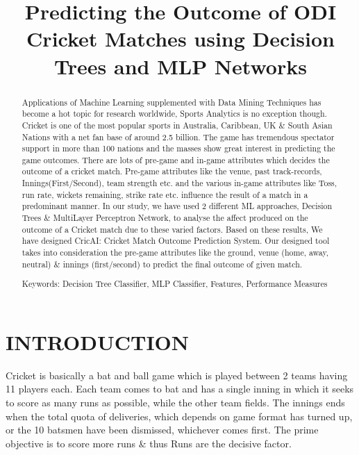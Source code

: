 \documentclass[a4paper, 10pt, conference]{IEEEtran}
\title{Predicting the Outcome of ODI Cricket Matches using Decision Trees and MLP Networks}
\author{
\IEEEauthorblockN{Rajeev Kumar\IEEEauthorrefmark{1},Jalaz Kumar\IEEEauthorrefmark{2}}
\IEEEauthorblockA{
\IEEEauthorrefmark{1}Assistant Professor,\IEEEauthorrefmark{2}Student\\
Department of Computer Science and Engineering\\
National Institute of Technology Hamirpur, India\\
Email: \IEEEauthorrefmark{1}rajeev@nith.ac.in,\IEEEauthorrefmark{2}jalazkumar1208@gmail.com}}
\begin{document}
\maketitle
\thispagestyle{empty}
\pagestyle{empty}


\begin{abstract}

Applications of Machine Learning supplemented with Data Mining Techniques has become a hot topic for research worldwide, Sports Analytics is no exception though. Cricket is one of the most popular sports in Australia, Caribbean, UK \& South Asian Nations with a net fan base of around 2.5 billion. The game has tremendous spectator support in more than 100 nations and the masses show great interest in predicting the game outcomes. There are lots of pre-game and in-game attributes which decides the outcome of a cricket match. Pre-game attributes like the venue, past track-records, Innings(First/Second), team strength etc. and the various in-game attributes like Toss, run rate, wickets remaining, strike rate etc. influence the result of a match in a predominant manner. In our study, we have used 2 different ML approaches, Decision Trees \& MultiLayer Perceptron Network, to analyse the affect produced on the outcome of a Cricket match due to these varied factors. Based on these results, We have designed CricAI: Cricket Match Outcome Prediction System. Our designed tool takes into consideration the pre-game attributes like the ground, venue (home, away, neutral) \& innings (first/second) to predict the final outcome of given match.


Keywords: Decision Tree Classifier, MLP Classifier, Features, Performance Measures

\end{abstract}


\section{INTRODUCTION}

Cricket is basically a bat and ball game which is played between 2 teams having 11 players each. Each team comes to bat and has a single inning in which it seeks to score as many runs as possible, while the other team fields. The innings ends when the total quota of deliveries, which depends on game format has turned up, or the 10 batsmen have been dismissed, whichever comes first. The prime objective is to score more runs \& thus Runs are the decisive factor.
\end{document}
